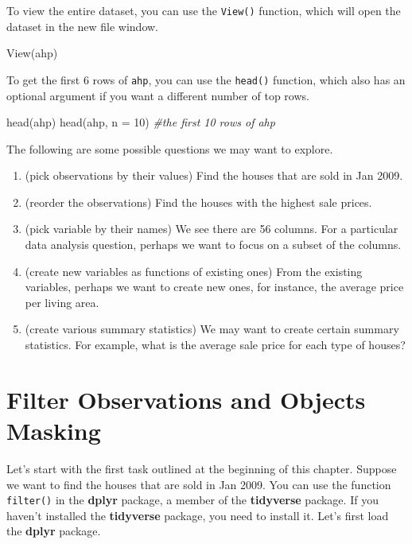 \documentclass[
]{book}
\newenvironment{Shaded}{\begin{snugshade}}{\end{snugshade}}
\newcommand{\AttributeTok}[1]{\textcolor[rgb]{0.77,0.63,0.00}{#1}}
\newcommand{\CommentTok}[1]{\textcolor[rgb]{0.56,0.35,0.01}{\textit{#1}}}
\newcommand{\DecValTok}[1]{\textcolor[rgb]{0.00,0.00,0.81}{#1}}
\newcommand{\FunctionTok}[1]{\textcolor[rgb]{0.00,0.00,0.00}{#1}}
\newcommand{\NormalTok}[1]{#1}
\begin{document}
To view the entire dataset, you can use the \texttt{View()} function, which will open the dataset in the new file window.

\begin{Shaded}
\begin{Highlighting}[]
\FunctionTok{View}\NormalTok{(ahp)}
\end{Highlighting}
\end{Shaded}

To get the first 6 rows of \texttt{ahp}, you can use the \texttt{head()} function, which also has an optional argument if you want a different number of top rows.

\begin{Shaded}
\begin{Highlighting}[]
\FunctionTok{head}\NormalTok{(ahp)}
\FunctionTok{head}\NormalTok{(ahp, }\AttributeTok{n =} \DecValTok{10}\NormalTok{) }\CommentTok{\#the first 10 rows of ahp}
\end{Highlighting}
\end{Shaded}

The following are some possible questions we may want to explore.

\begin{enumerate}
\def\labelenumi{\arabic{enumi}.}
\item
  (pick observations by their values) Find the houses that are sold in Jan 2009.
\item
  (reorder the observations) Find the houses with the highest sale prices.
\item
  (pick variable by their names) We see there are 56 columns. For a particular data analysis question, perhaps we want to focus on a subset of the columns.
\item
  (create new variables as functions of existing ones) From the existing variables, perhaps we want to create new ones, for instance, the average price per living area.
\item
  (create various summary statistics) We may want to create certain summary statistics. For example, what is the average sale price for each type of houses?
\end{enumerate}

\hypertarget{filter-observations}{%
\section{Filter Observations and Objects Masking}\label{filter-observations}}

Let's start with the first task outlined at the beginning of this chapter. Suppose we want to find the houses that are sold in Jan 2009. You can use the function \texttt{filter()} in the \textbf{dplyr} package, a member of the \textbf{tidyverse} package. If you haven't installed the \textbf{tidyverse} package, you need to install it. Let's first load the \textbf{dplyr} package.
\end{document}
